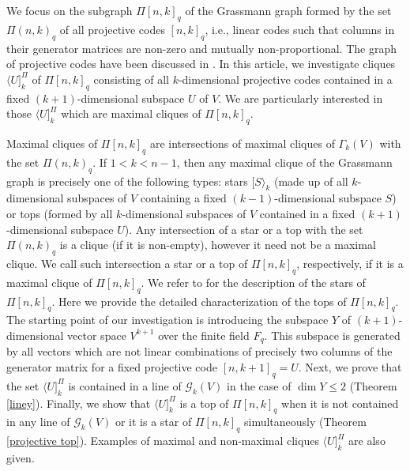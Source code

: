 \documentclass[12pt]{article}
\theoremstyle{definition}
\begin{document}
We focus on the subgraph $\Pi[n,k]_q$ of the Grassmann graph formed by the set $\Pi(n,k)_q$ of all projective codes $[n,k]_{q}$, i.e., linear codes such that columns in their generator matrices are non-zero and mutually non-proportional. The graph of projective codes have been discussed in \cite{KP3}.
In this article, we investigate cliques $\langle U]^{\Pi}_{k}$ of  $\Pi[n,k]_q$ consisting of all $k$-dimensional projective codes contained in a fixed  $(k+1)$-dimensional subspace $U$ of $V$. We are particularly interested in those $\langle U]^{\Pi}_{k}$  which are maximal cliques of $\Pi[n,k]_q$.

Maximal cliques  of $\Pi[n,k]_q$ are intersections of maximal cliques of $\Gamma_k(V)$ with the set $\Pi(n,k)_q$. If $1<k<n-1$, then any maximal clique of the Grassmann graph is precisely one of the following types: stars $[S\rangle_k$ (made up of all $k$-dimensional subspaces of $V$ containing a fixed $(k-1)$-dimensional subspace $S$) or tops (formed by all $k$-dimensional subspaces of $V$ contained in a fixed $(k+1)$-dimensional subspace $U$). Any  intersection of a star or a top with the set $\Pi(n, k)_q$ is a clique (if it is non-empty), however it need not be a maximal clique.  We call  such intersection a star or a top  of $\Pi[n,k]_q$, respectively, if it is a maximal clique of $\Pi[n,k]_q$. We refer to \cite{B} for the description of the stars of $\Pi[n,k]_q$. Here we  provide the detailed characterization of the tops  of $\Pi[n, k]_q$. %
The starting point of our investigation is introducing the subspace $Y$ of $(k+1)$-dimensional vector space $V^{k+1}$ over the finite field $F_q$. This subspace is generated by all vectors which are not linear combinations of precisely two columns of the generator matrix for a fixed projective code $[n,k+1]_{q}=U$.  Next, we prove that the set $\langle U]^{\Pi}_{k}$ is contained in a line of ${\mathcal G}_{k}(V)$  in the case of $\dim Y\leqslant2$  (Theorem \ref{liney}). Finally, we show that $\langle U]^{\Pi}_{k}$ is a top of $\Pi[n,k]_q$  when it is not contained in any line of ${\mathcal G}_{k}(V)$ or it is a star of $\Pi[n,k]_q$ simultaneously (Theorem \ref{projective top}). %
 Examples of maximal and non-maximal cliques $\langle U]^{\Pi}_{k}$
 are also given.
\end{document}
